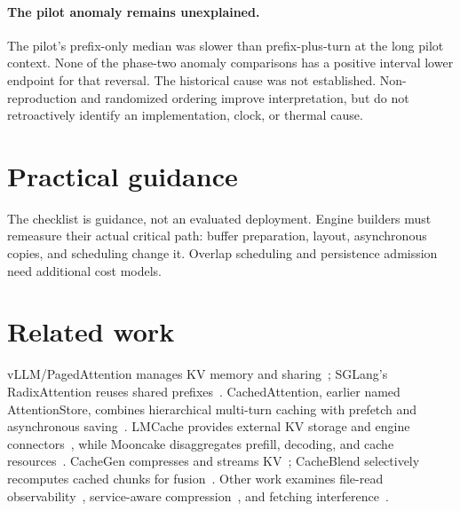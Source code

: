 \documentclass[10pt]{article}
\begin{document}
\paragraph{The pilot anomaly remains unexplained.}
The pilot's prefix-only median was slower than prefix-plus-turn at the long pilot context. None of the  phase-two anomaly comparisons has a positive interval lower endpoint for that reversal. The historical cause was not established. Non-reproduction and randomized ordering improve interpretation, but do not retroactively identify an implementation, clock, or thermal cause.

\section{Practical guidance}\label{sec:guide}
\noindent{}

The checklist is guidance, not an evaluated deployment. Engine builders must remeasure their actual critical path: buffer preparation, layout, asynchronous copies, and scheduling change it. Overlap scheduling and persistence admission need additional cost models.

\section{Related work}\label{sec:related}
vLLM/PagedAttention manages KV memory and sharing~\citep{vllm}; SGLang's RadixAttention reuses shared prefixes~\citep{sglang}. CachedAttention, earlier named AttentionStore, combines hierarchical multi-turn caching with prefetch and asynchronous saving~\citep{cachedattention}. LMCache provides external KV storage and engine connectors~\citep{lmcache}, while Mooncake disaggregates prefill, decoding, and cache resources~\citep{mooncake}. CacheGen compresses and streams KV~\citep{cachegen}; CacheBlend selectively recomputes cached chunks for fusion~\citep{cacheblend}. Other work examines file-read observability~\citep{fileobservability}, service-aware compression~\citep{kvserve}, and fetching interference~\citep{shadowserve}.
\end{document}
